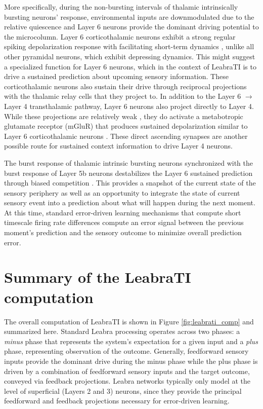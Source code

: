 \documentclass[dwyatte_dissertation.tex]{subfiles}
\begin{document}
More specifically, during the non-bursting intervals of thalamic intrinsically bursting neurons' response, environmental inputs are downmodulated due to the relative quiescence and Layer 6 neurons provide the dominant driving potential to the microcolumn. Layer 6 corticothalamic neurons exhibit a strong regular spiking depolarization response with facilitating short-term dynamics \cite{Thomson10}, unlike all other pyramidal neurons, which exhibit depressing dynamics. This might suggest a specialized function for Layer 6 neurons, which in the context of LeabraTI is to drive a sustained prediction about upcoming sensory information. These corticothalamic neurons also sustain their drive through reciprocal projections with the thalamic relay cells that they project to. In addition to the Layer 6 $\rightarrow$ Layer 4 transthalamic pathway, Layer 6 neurons also project directly to Layer 4. While these projections are relatively weak \cite{HirschMartinez06b}, they do activate a metabotropic glutamate receptor (mGluR) that produces sustained depolarization similar to Layer 6 corticothalamic neurons \cite{LeeSherman09}. These direct ascending synapses are another possible route for sustained context information to drive Layer 4 neurons. 

The burst response of thalamic intrinsic bursting neurons synchronized with the burst response of Layer 5b neurons destabilizes the Layer 6 sustained prediction through biased competition \cite{WyatteHerdMingusEtAl12,DesimoneDuncan95}. This provides a snapshot of the current state of the sensory periphery as well as an opportunity to integrate the state of current sensory event into a prediction about what will happen during the next moment. At this time, standard error-driven learning mechanisms that compute short timescale firing rate differences \cite{OReillyMunakata00,OReillyMunakataFrankEtAl12} compute an error signal between the previous moment's prediction and the sensory outcome to minimize overall prediction error.

\section{Summary of the LeabraTI computation}
The overall computation of LeabraTI is shown in Figure \ref{fig:leabrati_comp} and summarized here. Standard Leabra processing operates across two phases: a \textit{minus} phase that represents the system's expectation for a given input and a \textit{plus} phase, representing observation of the outcome. Generally, feedforward sensory inputs provide the dominant drive during the minus phase while the plus phase is driven by a combination of feedforward sensory inputs and the target outcome, conveyed via feedback projections. Leabra networks typically only model at the level of superficial (Layers 2 and 3) neurons, since they provide the principal feedforward and feedback projections necessary for error-driven learning.
\end{document}

